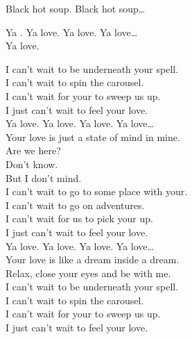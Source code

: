 Black hot soup. Black hot soup… \\





Ya . Ya love. Ya love. Ya love… \\

Ya love.

I can't wait to be underneath your spell. \\
I can't wait to spin the carousel. \\
I can't wait for your to sweep us up. \\
I just can't wait to feel your love. \\

Ya love. Ya love. Ya love. Ya love… \\

Your love is just a state of mind in mine. \\
Are we here? \\
Don't know. \\
But I don't mind. \\

I can't wait to go to some place with your. \\
I can't wait to go on adventures. \\
I can't wait for us to pick your up. \\
I just can't wait to feel your love. \\

Ya love. Ya love. Ya love. Ya love… \\

Your love is like a dream inside a dream. \\
Relax, close your eyes and be with me. \\

I can't wait to be underneath your spell. \\
I can't wait to spin the carousel. \\
I can't wait for your to sweep us up. \\
I just can't wait to feel your love. \\



